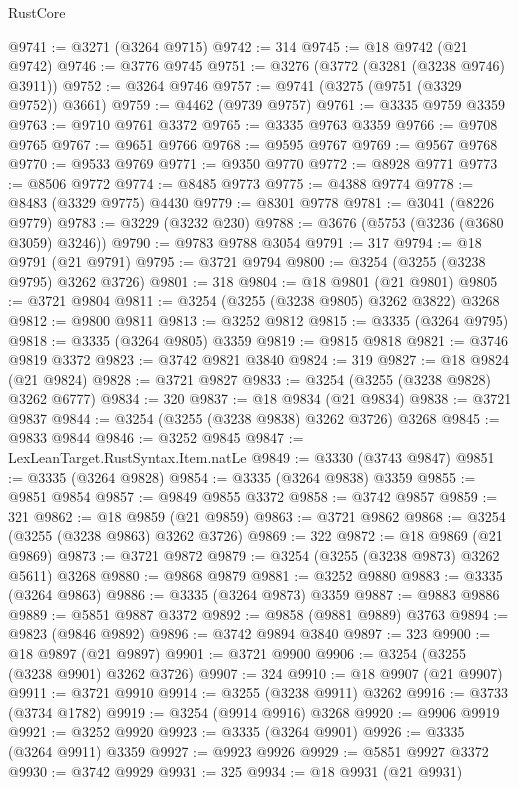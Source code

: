 \begin{lexlean}{RustCore}
\begin{coremodule}
@9741 := @3271 (@3264 @9715)
@9742 := 314
@9745 := @18 @9742 (@21 @9742)
@9746 := @3776 @9745
@9751 := @3276 (@3772 (@3281 (@3238 @9746) @3911))
@9752 := @3264 @9746
@9757 := @9741 (@3275 (@9751 (@3329 @9752)) @3661)
@9759 := @4462 (@9739 @9757)
@9761 := @3335 @9759 @3359
@9763 := @9710 @9761 @3372
@9765 := @3335 @9763 @3359
@9766 := @9708 @9765
@9767 := @9651 @9766
@9768 := @9595 @9767
@9769 := @9567 @9768
@9770 := @9533 @9769
@9771 := @9350 @9770
@9772 := @8928 @9771
@9773 := @8506 @9772
@9774 := @8485 @9773
@9775 := @4388 @9774
@9778 := @8483 (@3329 @9775) @4430
@9779 := @8301 @9778
@9781 := @3041 (@8226 @9779)
@9783 := @3229 (@3232 @230)
@9788 := @3676 (@5753 (@3236 (@3680 @3059) @3246))
@9790 := @9783 @9788 @3054
@9791 := 317
@9794 := @18 @9791 (@21 @9791)
@9795 := @3721 @9794
@9800 := @3254 (@3255 (@3238 @9795) @3262 @3726)
@9801 := 318
@9804 := @18 @9801 (@21 @9801)
@9805 := @3721 @9804
@9811 := @3254 (@3255 (@3238 @9805) @3262 @3822) @3268
@9812 := @9800 @9811
@9813 := @3252 @9812
@9815 := @3335 (@3264 @9795)
@9818 := @3335 (@3264 @9805) @3359
@9819 := @9815 @9818
@9821 := @3746 @9819 @3372
@9823 := @3742 @9821 @3840
@9824 := 319
@9827 := @18 @9824 (@21 @9824)
@9828 := @3721 @9827
@9833 := @3254 (@3255 (@3238 @9828) @3262 @6777)
@9834 := 320
@9837 := @18 @9834 (@21 @9834)
@9838 := @3721 @9837
@9844 := @3254 (@3255 (@3238 @9838) @3262 @3726) @3268
@9845 := @9833 @9844
@9846 := @3252 @9845
@9847 := LexLeanTarget.RustSyntax.Item.natLe
@9849 := @3330 (@3743 @9847)
@9851 := @3335 (@3264 @9828)
@9854 := @3335 (@3264 @9838) @3359
@9855 := @9851 @9854
@9857 := @9849 @9855 @3372
@9858 := @3742 @9857
@9859 := 321
@9862 := @18 @9859 (@21 @9859)
@9863 := @3721 @9862
@9868 := @3254 (@3255 (@3238 @9863) @3262 @3726)
@9869 := 322
@9872 := @18 @9869 (@21 @9869)
@9873 := @3721 @9872
@9879 := @3254 (@3255 (@3238 @9873) @3262 @5611) @3268
@9880 := @9868 @9879
@9881 := @3252 @9880
@9883 := @3335 (@3264 @9863)
@9886 := @3335 (@3264 @9873) @3359
@9887 := @9883 @9886
@9889 := @5851 @9887 @3372
@9892 := @9858 (@9881 @9889) @3763
@9894 := @9823 (@9846 @9892)
@9896 := @3742 @9894 @3840
@9897 := 323
@9900 := @18 @9897 (@21 @9897)
@9901 := @3721 @9900
@9906 := @3254 (@3255 (@3238 @9901) @3262 @3726)
@9907 := 324
@9910 := @18 @9907 (@21 @9907)
@9911 := @3721 @9910
@9914 := @3255 (@3238 @9911) @3262
@9916 := @3733 (@3734 @1782)
@9919 := @3254 (@9914 @9916) @3268
@9920 := @9906 @9919
@9921 := @3252 @9920
@9923 := @3335 (@3264 @9901)
@9926 := @3335 (@3264 @9911) @3359
@9927 := @9923 @9926
@9929 := @5851 @9927 @3372
@9930 := @3742 @9929
@9931 := 325
@9934 := @18 @9931 (@21 @9931)

\end{coremodule}
\end{lexlean}
